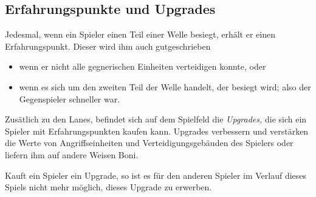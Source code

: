 \subsection{Erfahrungspunkte und Upgrades}\label{sec:exp-upgrades}

Jedesmal, wenn ein Spieler einen Teil einer Welle besiegt, erhält er einen
Erfahrungspunkt. Dieser wird ihm auch gutgeschrieben
\begin{itemize}[noitemsep]
    \item wenn er nicht alle gegnerischen Einheiten verteidigen konnte,
    oder
    \item wenn es sich um den zweiten Teil der Welle handelt, der
      besiegt wird; also der Gegenspieler schneller war.
\end{itemize}

\noindent
Zusätlich zu den Lanes, befindet sich auf dem Spielfeld die \emph{Upgrades,}
die sich ein Spieler mit Erfahrungspunkten kaufen kann.  Upgrades verbessern
und verstärken die Werte von Angriffseinheiten und Verteidigungsgebäuden des
Spielers oder liefern ihm auf andere Weisen Boni.

Kauft ein Spieler ein Upgrade, so ist es für den anderen Spieler im Verlauf
dieses Spiels nicht mehr möglich, dieses Upgrade zu erwerben.
